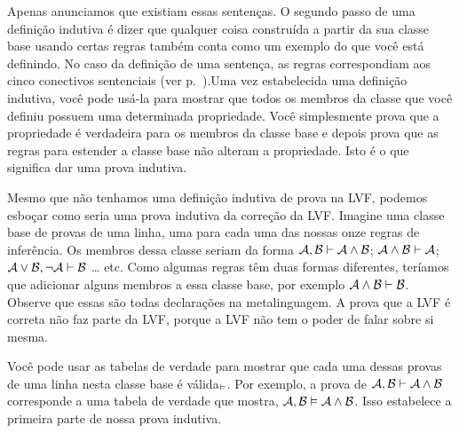 Apenas anunciamos que existiam essas senten\c cas. O segundo passo de uma defini\c c\~ao indutiva \'e dizer que qualquer coisa constru\'ida a partir da sua classe base usando certas regras tamb\'em conta como um exemplo do que voc\^e est\'a definindo. No caso da defini\c c\~ao de uma senten\c ca, as regras correspondiam aos cinco conectivos sentenciais (ver  p.~\pageref{TFLsentences}).Uma vez  estabelecida uma defini\c c\~ao indutiva, voc\^e pode us\'a-la para mostrar que todos os membros da classe que voc\^e definiu possuem uma determinada propriedade. Voc\^e simplesmente prova que a propriedade \'e verdadeira para os membros da classe base e depois prova que as regras para estender a classe base n\~ao alteram a propriedade. Isto \'e o que significa dar uma prova indutiva.
 
 Mesmo que n\~ao tenhamos uma defini\c c\~ao indutiva de prova na LVF, podemos esbo\c car como seria uma prova indutiva da corre\c c\~ao da LVF. Imagine uma classe base de provas de uma linha, uma para cada uma das nossas onze regras de infer\^encia. Os membros dessa classe seriam da forma $\mathcal{A}, \mathcal{B} \vdash  \mathcal{A} \wedge \mathcal{B}$; $\mathcal{A} \wedge \mathcal{B} \vdash \mathcal{A}$; $\mathcal{A} \vee \mathcal{B}, \neg\mathcal{A} \vdash  \mathcal{B}$ \ldots{} etc. Como algumas regras t\^em duas formas diferentes, ter\'iamos que adicionar alguns membros a essa classe base, por exemplo $\mathcal{A} \wedge \mathcal{B} \vdash  \mathcal{B}$.  Observe que essas s\~ao todas declara\c c\~oes na metalinguagem. A prova  que a LVF \'e correta n\~ao faz parte da LVF, porque a LVF n\~ao tem o poder de falar sobre si mesma.

Voc\^e pode usar as tabelas de verdade para mostrar que cada uma dessas provas de uma linha  nesta classe base \'e v\'alida$_{\vDash}$. Por exemplo, a prova de $\mathcal{A}, \mathcal{B} \vdash \mathcal{A} \wedge \mathcal{B}$ corresponde a uma tabela de verdade que mostra, $\mathcal{A}, \mathcal{B} \vDash  \mathcal{A} \wedge \mathcal{B}$. Isso estabelece a primeira parte de nossa prova indutiva.  

